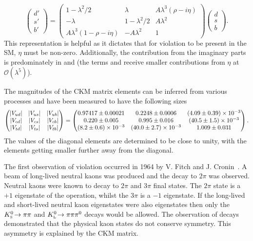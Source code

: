 \begin{equation}
\left( \begin{array}{c} d' \\ s'  \\ b' \end{array} \right) = \begin{pmatrix} 1 - \lambda^2/2 & \lambda & A\lambda^3(\rho-i\eta) \\ -\lambda & 1-\lambda^2/2 & A\lambda^2  \\ A\lambda^3(1-\rho-i\eta) & -A\lambda^2 & 1 \end{pmatrix} \left( \begin{array}{c} d \\ s  \\ b \end{array} \right).
\end{equation}
This representation is helpful as it dictates that for \CP violation to be present in the SM, $\eta$ must be non-zero. Additionally, the contribution from the imaginary parts is predominately in \Vub and \Vtd (the terms \Vcd and \Vts receive smaller contributions from $\eta$ at $\mathcal{O}(\lambda^{5})$). 

The magnitudes of the CKM matrix elements can be inferred from various processes and have been measured to have the following sizes~\cite{PDG2016}
\begin{equation} 
    \begin{pmatrix} 
        |{V_{{u}{d}}}| & |{V_{{u}{s}}}| & |{V_{{u}{b}}}| \\ 
        |{V_{{c}{d}}}| & |{V_{{c}{s}}}| & |{V_{{c}{b}}}|  \\
        |{V_{{t}{d}}}| & |{V_{{t}{s}}}| & |{V_{{t}{b}}}| 
    \end{pmatrix}
    =
    \begin{pmatrix} 
        0.97417\pm0.00021        & 0.2248\pm0.0006           & (4.09\pm0.39)\times10^{-3}\\ 
        0.220\pm0.005            & 0.995\pm0.016             & (40.5\pm1.5)\times10^{-3} \\
        (8.2\pm0.6)\times10^{-3} & (40.0\pm2.7)\times10^{-3} & 1.009\pm0.031            
    \end{pmatrix}.
\end{equation}
The values of the diagonal elements are determined to be close to unity, with the elements getting smaller further away from the diagonal.

The first observation of \CP violation occurred in 1964 by V. Fitch and J. Cronin~\cite{PhysRevLett.13.138}.  
A beam of long-lived neutral kaons was produced and the decay to $2\pi$ was observed. Neutral kaons were known to decay to $2\pi$ and $3\pi$ final states. The $2\pi$ state is a $+1$ eigenstate of the \CP operation, whilst the $3\pi$ is a $-1$ eigenstate. If the long-lived and short-lived neutral kaon eigenstates were also \CP eigenstates then only the ${{K}^0_{\mathrm{ \scriptscriptstyle S}}}\!\rightarrow \pi\pi$ and ${{K}^0_{\mathrm{ \scriptscriptstyle L}}}\!\rightarrow \pi\pi{\ensuremath{{\pi}^0}}$ decays would be allowed. The observation of \decay{\KL}{\pip\pim} decays demonstrated that the physical kaon states do not conserve \CP symmetry. This \CP asymmetry is explained by the CKM matrix. 

